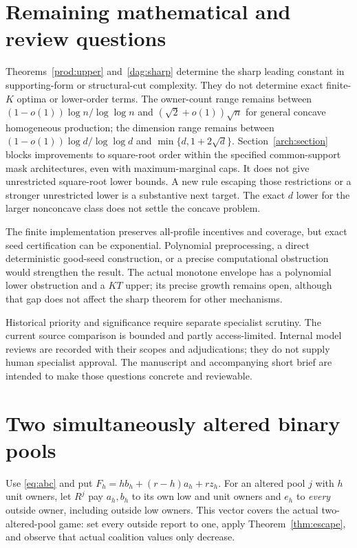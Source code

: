 \documentclass[11pt]{article}
\theoremstyle{definition}\newtheorem{definition}[theorem]{Definition}
\theoremstyle{remark}\newtheorem{remark}[theorem]{Remark}
\begin{document}
\section{Remaining mathematical and review questions}\label{sec:remaining}
Theorems~\ref{prod:upper} and~\ref{dag:sharp} determine the sharp leading
constant in supporting-form or structural-cut complexity. They do not determine
exact finite-$K$ optima or lower-order terms. The owner-count range remains
between $(1-o(1))\log n/\log\log n$ and $(\sqrt2+o(1))\sqrt n$ for general
concave homogeneous production; the dimension range remains between
$(1-o(1))\log d/\log\log d$ and $\min\{d,1+2\sqrt d\}$.
Section~\ref{arch:section} blocks improvements to square-root order within
the specified common-support mask architectures, even with maximum-marginal
caps. It does not give unrestricted square-root lower bounds. A new rule
escaping those restrictions or a stronger unrestricted lower is a substantive
next target. The exact $d$ lower for the larger
nonconcave class does not settle the concave problem.

The finite implementation preserves all-profile incentives and coverage,
but exact seed certification can be exponential. Polynomial preprocessing,
a direct deterministic good-seed construction, or a precise computational
obstruction would strengthen the result. The actual monotone envelope has a
polynomial lower obstruction and a $KT$ upper; its precise growth remains
open, although that gap does not affect the sharp theorem for other mechanisms.

Historical priority and significance require separate specialist scrutiny.
The current source comparison is bounded and partly access-limited. Internal
model reviews are recorded with their scopes and adjudications; they do not
supply human specialist approval. The manuscript and accompanying short brief
are intended to make those questions concrete and reviewable.


\appendix

\section{Two simultaneously altered binary pools}\label{app:binary}
Use \eqref{eq:abc} and put $F_h=h b_h+(r-h)a_h+rz_h$. For an altered pool
$j$ with $h$ unit owners, let $R^j$ pay $a_h,b_h$ to its own low and unit
owners and $e_h$ to \emph{every} outside owner, including outside low owners.
This vector covers the actual two-altered-pool game: set every outside report
to one, apply Theorem~\ref{thm:escape}, and observe that actual coalition
values only decrease.
\end{document}
